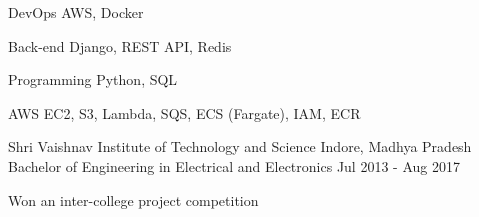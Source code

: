 \documentclass{my_resume}
\begin{document}
	\begin{cvskills}
		\cvskill
			{DevOps} %
			{AWS, Docker} %

		\cvskill
			{Back-end} %
			{Django, REST API, Redis} %

		\cvskill
			{Programming} %
			{Python, SQL} %

		\cvskill
		{AWS}
		{EC2, S3, Lambda, SQS, ECS (Fargate), IAM, ECR}
	\end{cvskills}


	\begin{cventries}
		\cventry
			{Shri Vaishnav Institute of Technology and Science} %
			{Indore, Madhya Pradesh} %
			{Bachelor of Engineering in Electrical and Electronics} %
			{Jul 2013 - Aug 2017} %

		\begin{cvitems} %
			\item {Won an inter-college project competition}
		\end{cvitems}
	\end{cventries}
\end{document}
